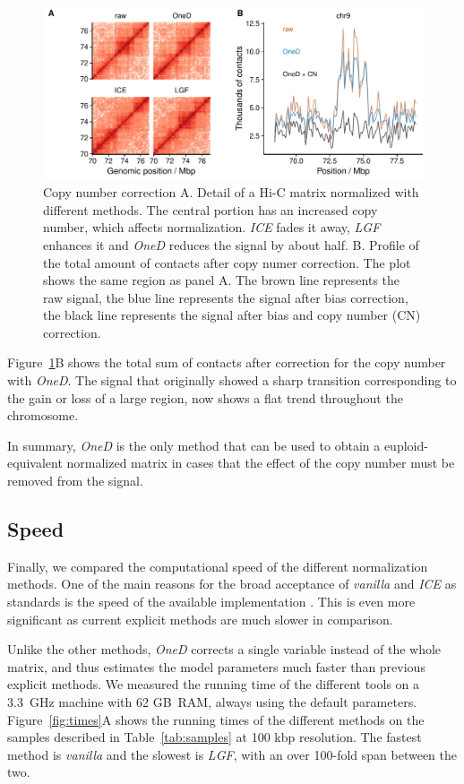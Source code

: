 \documentclass{bioinfo}
\begin{document}
\begin{figure}
\centerline{\includegraphics[width=.5\textwidth]
  {img/figure_cnv_correction.pdf}}
\caption{
Copy number correction A. Detail of a Hi-C matrix normalized with
different methods. The central portion has an increased copy number, which
affects normalization. \textit{ICE} fades it away, \textit{LGF} enhances
it and \textit{OneD} reduces the signal by about half. B. Profile of the
total amount of contacts after copy numer correction. The plot shows the
same region as panel A. The brown line represents the raw
signal, the blue line represents the signal after bias correction, the
black line represents the signal after bias and copy number (CN) correction.}
\label{fig:cnv_correction}
\end{figure}

Figure~\ref{fig:cnv_correction}B shows the total sum of contacts after
correction for the copy number with \textit{OneD}. The signal that
originally showed a sharp transition corresponding to the gain or loss of
a large region, now shows a flat trend throughout the chromosome.

In summary, \textit{OneD} is the only method that can be used to obtain a
euploid-equivalent normalized matrix in cases that the effect of the copy
number must be removed from the signal.



\subsection{Speed}

Finally, we compared the computational speed of the different
normalization methods. One of the main reasons for the broad acceptance of
\textit{vanilla} and \textit{ICE} as standards is the speed of the
available implementation \citep{imakaev2012iterative}. This is even more
significant as current explicit methods \citep{servant2012hitc} are much
slower in comparison.

Unlike the other methods, \textit{OneD} corrects a single variable instead
of the whole matrix, and thus estimates the model parameters much faster
than previous explicit methods. We measured the running time of the
different tools on a 3.3~GHz machine with 62 GB~RAM, always using the
default parameters. Figure~\ref{fig:times}A shows the running times of the
different methods on the samples described in Table~\ref{tab:samples} at
100 kbp resolution. The fastest method is \textit{vanilla} and the slowest
is \textit{LGF}, with an over 100-fold span between the two.
\end{document}
